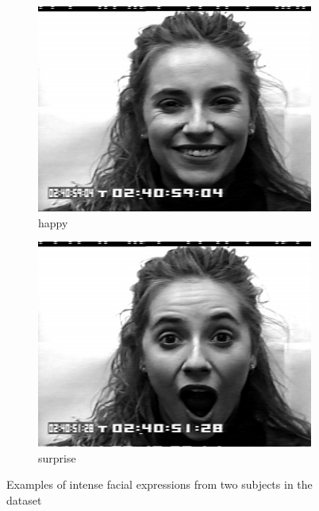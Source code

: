 \begin{figure}
\begin{subfigure}[b]{0.22\textwidth}
		\includegraphics[width=\textwidth]{./img/dataset/happy.png}
		\caption{happy}
		\label{fig:dataset:happy}
	\end{subfigure}
	\begin{subfigure}[b]{0.22\textwidth}
		\includegraphics[width=\textwidth]{./img/dataset/surprise.png}
		\caption{surprise}
		\label{fig:dataset:surprise}
	\end{subfigure}
    \caption[Examples of intense facial expressions]{Examples of intense facial expressions from two subjects in the dataset}
    \label{fig:dataset images}
\end{figure}

